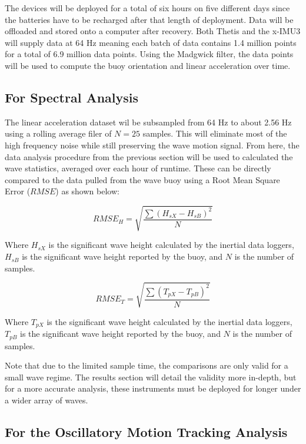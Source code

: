 The devices will be deployed for a total of six hours on five different days since the batteries have to be recharged after that length of deployment. 
Data will be offloaded and stored onto a computer after recovery. 
Both Thetis and the x-IMU3 will supply data at 64 Hz meaning each batch of data contains 1.4 million points for a total of 6.9 million data points. 
Using the Madgwick filter, the data points will be used to compute the buoy orientation and linear acceleration over time.

\subsection{For Spectral Analysis}
The linear acceleration dataset wil be subsampled from 64 Hz to about 2.56 Hz using a rolling average filer of $N=25$ samples. 
This will eliminate most of the high frequency noise while still preserving the wave motion signal. 
From here, the data analysis procedure from the previous section will be used to calculated the wave statistics, averaged over each hour of runtime. 
These can be directly compared to the data pulled from the wave buoy using a Root Mean Square Error ($RMSE$) as shown below:

\begin{equation}
    RMSE_H = \sqrt{\frac{\sum{(H_{sX}-H_{sB})^2}}{N}}
\end{equation}

Where $H_{sX}$ is the significant wave height calculated by the inertial data loggers, $H_{sB}$ is the significant wave height reported by the buoy, and $N$ is the number of samples.

\begin{equation}
    RMSE_T = \sqrt{\frac{\sum{(T_{pX}-T_{pB})^2}}{N}}
\end{equation}

Where $T_{pX}$ is the significant wave height calculated by the inertial data loggers, $T_{pB}$ is the significant wave height reported by the buoy, and $N$ is the number of samples.

Note that due to the limited sample time, the comparisons are only valid for a small wave regime. 
The results section will detail the validity more in-depth, but for a more accurate analysis, these instruments must be deployed for longer under a wider array of waves.

\subsection{For the Oscillatory Motion Tracking Analysis}

